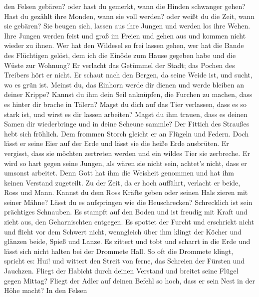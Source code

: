 den Felsen gebären? oder hast du gemerkt, wann die Hinden schwanger
gehen?  Hast du gezählt ihre Monden, wann sie voll werden?
oder weißt du die Zeit, wann sie gebären?  Sie beugen sich,
lassen aus ihre Jungen und werden los ihre Wehen.  Ihre
Jungen werden feist und groß im Freien und gehen aus und kommen nicht
wieder zu ihnen.  Wer hat den Wildesel so frei lassen gehen,
wer hat die Bande des Flüchtigen gelöst,  dem ich die Einöde
zum Hause gegeben habe und die Wüste zur Wohnung?  Er
verlacht das Getümmel der Stadt; das Pochen des Treibers hört er nicht.
 Er schaut nach den Bergen, da seine Weide ist, und sucht,
wo es grün ist.  Meinst du, das Einhorn werde dir dienen und
werde bleiben an deiner Krippe?  Kannst du ihm dein Seil
anknüpfen, die Furchen zu machen, dass es hinter dir brache in Tälern?
 Magst du dich auf das Tier verlassen, dass es so stark
ist, und wirst es dir lassen arbeiten?  Magst du ihm
trauen, dass es deinen Samen dir wiederbringe und in deine Scheune
sammle?  Der Fittich des Straußes hebt sich fröhlich. Dem
frommen Storch gleicht er an Flügeln und Federn.  Doch
lässt er seine Eier auf der Erde und lässt sie die heiße Erde ausbrüten.
 Er vergisst, dass sie möchten zertreten werden und ein
wildes Tier sie zerbreche.  Er wird so hart gegen seine
Jungen, als wären sie nicht sein, achtet's nicht, dass er umsonst
arbeitet.  Denn Gott hat ihm die Weisheit genommen und hat
ihm keinen Verstand zugeteilt.  Zu der Zeit, da er hoch
auffährt, verlacht er beide, Ross und Mann.  Kannst du dem
Ross Kräfte geben oder seinen Hals zieren mit seiner Mähne?
 Lässt du es aufspringen wie die Heuschrecken? Schrecklich
ist sein prächtiges Schnauben.  Es stampft auf den Boden
und ist freudig mit Kraft und zieht aus, den Geharnischten entgegen.
 Es spottet der Furcht und erschrickt nicht und flieht vor
dem Schwert nicht,  wenngleich über ihm klingt der Köcher
und glänzen beide, Spieß und Lanze.  Es zittert und tobt
und scharrt in die Erde und lässt sich nicht halten bei der Drommete
Hall.  So oft die Drommete klingt, spricht es: Hui! und
wittert den Streit von ferne, das Schreien der Fürsten und Jauchzen.
 Fliegt der Habicht durch deinen Verstand und breitet seine
Flügel gegen Mittag?  Fliegt der Adler auf deinen Befehl so
hoch, dass er sein Nest in der Höhe macht?  In den Felsen
